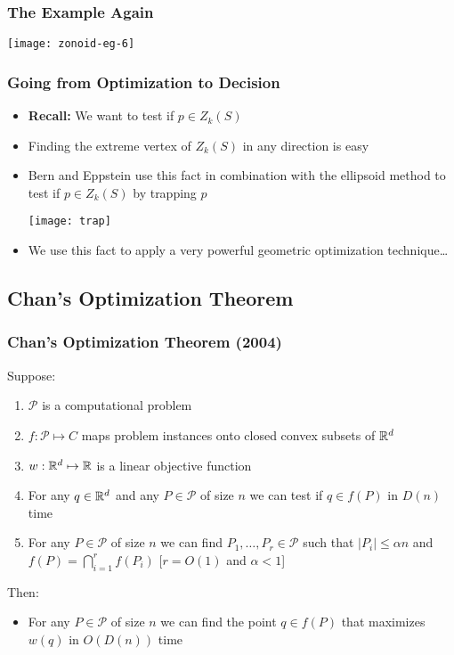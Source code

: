 \documentclass{beamer}
\begin{document}
{\frame
{
   \frametitle{The Example Again}
   \begin{center}
    \texttt{[image: zonoid-eg-6]}
   \end{center}
}



\frame
{
   \frametitle{Going from Optimization to Decision}
 \begin{itemize}
   \item<1->\textbf{Recall:} We want to test if $p\in Z_k(S)$
   \item<1->Finding the extreme vertex of $Z_k(S)$ in any direction
	is easy
   \item<2->Bern and Eppstein use this fact in combination with the 
	ellipsoid method to test if 
	$p\in Z_k(S)$ by trapping $p$
	\begin{center}\texttt{[image: trap]}\end{center}
   \item<3-> We use this fact to apply a very powerful
	geometric optimization technique\ldots
  \end{itemize}
}

\subsection{Chan's Optimization Theorem}
\frame
{
  \frametitle{Chan's Optimization Theorem (2004)}
  Suppose:  
  \begin{enumerate}
   \item<1-> $\mathcal{P}$ is a computational problem
   \item<2-> $f:\mathcal{P}\mapsto C$ maps problem instances onto closed 
         convex subsets of $\mathbb{R}^d$
   \item<3-> $w:\mathbb{R}^d\mapsto \mathbb{R}$ is a linear objective function
   \item<5-> For any $q\in\mathbb{R}^d$ and any $P\in\mathcal{P}$ of size $n$ we
         can test if $q\in f(P)$ in $D(n)$ time
   \item<6-> For any $P\in\mathcal{P}$ of size $n$ we can find
         $P_1,\ldots, P_r\in\mathcal{P}$ such that $|P_i|\le\alpha n$ 
         and $f(P)=\bigcap_{i=1}^r f(P_i)$ \hfill{[$r=O(1)$ and $\alpha<1$]}
  \end{enumerate}
  Then:
  \begin{itemize}
    \item<4-> For any $P\in\mathcal{P}$ of size $n$ we can find the point
    $q\in f(P)$ that maximizes $w(q)$ in $O(D(n))$ time
  \end{itemize}
} 

}
\end{document}
